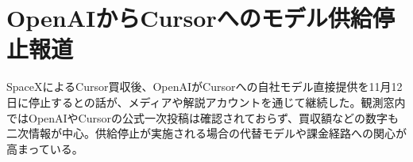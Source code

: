\section{OpenAIからCursorへのモデル供給停止報道}
SpaceXによるCursor買収後、OpenAIがCursorへの自社モデル直接提供を11月12日に停止するとの話が、メディアや解説アカウントを通じて継続した。観測窓内ではOpenAIやCursorの公式一次投稿は確認されておらず、買収額などの数字も二次情報が中心。供給停止が実施される場合の代替モデルや課金経路への関心が高まっている。
